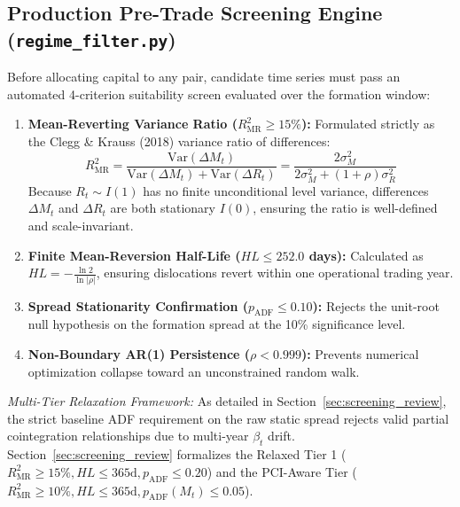 \documentclass[11pt, a4paper]{article}
\begin{document}
\subsection{Production Pre-Trade Screening Engine (\texttt{regime\_filter.py})}
Before allocating capital to any pair, candidate time series must pass an automated 4-criterion suitability screen evaluated over the formation window:
\begin{enumerate}
    \item \textbf{Mean-Reverting Variance Ratio ($R^2_{\text{MR}} \ge 15\%$):}  
    Formulated strictly as the Clegg \& Krauss (2018) variance ratio of differences:
    \begin{equation}
        R^2_{\text{MR}} = \frac{\text{Var}(\Delta M_t)}{\text{Var}(\Delta M_t) + \text{Var}(\Delta R_t)} = \frac{2\sigma_M^2}{2\sigma_M^2 + (1+\rho)\sigma_R^2}
    \end{equation}
    Because $R_t \sim I(1)$ has no finite unconditional level variance, differences $\Delta M_t$ and $\Delta R_t$ are both stationary $I(0)$, ensuring the ratio is well-defined and scale-invariant.
    \item \textbf{Finite Mean-Reversion Half-Life ($HL \le 252.0$ days):}  
    Calculated as $HL = -\frac{\ln 2}{\ln |\rho|}$, ensuring dislocations revert within one operational trading year.
    \item \textbf{Spread Stationarity Confirmation ($p_{\text{ADF}} \le 0.10$):}  
    Rejects the unit-root null hypothesis on the formation spread at the 10\% significance level.
    \item \textbf{Non-Boundary AR(1) Persistence ($\rho < 0.999$):}  
    Prevents numerical optimization collapse toward an unconstrained random walk.
\end{enumerate}
\textit{Multi-Tier Relaxation Framework:} As detailed in Section~\ref{sec:screening_review}, the strict baseline ADF requirement on the raw static spread rejects valid partial cointegration relationships due to multi-year $\beta_t$ drift. Section~\ref{sec:screening_review} formalizes the Relaxed Tier 1 ($R^2_{\text{MR}} \ge 15\%, HL \le 365\text{d}, p_{\text{ADF}} \le 0.20$) and the PCI-Aware Tier ($R^2_{\text{MR}} \ge 10\%, HL \le 365\text{d}, p_{\text{ADF}}(M_t) \le 0.05$).
\end{document}
